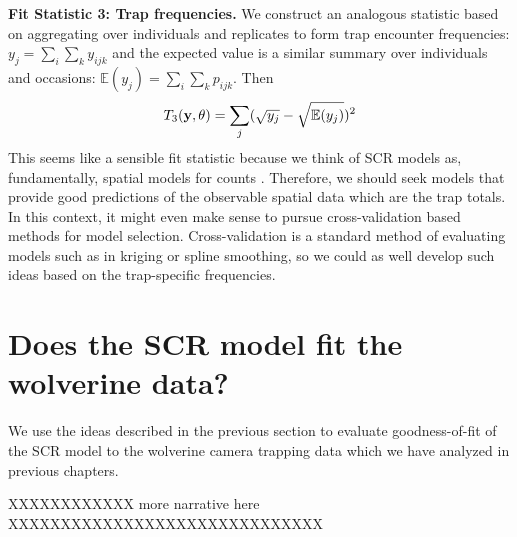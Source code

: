 {\bf Fit Statistic 3: Trap frequencies. } We construct an analogous
statistic based on aggregating over individuals and replicates to form
trap encounter frequencies: $y_{j} = \sum_{i} \sum_{k} y_{ijk}$
\citep{gopalaswamy_etal:2012ecol} and the expected value is a similar
summary over individuals and occasions: $\mathbb{E}(y_{j}) = \sum_{i}
\sum_{k} p_{ijk}$.  Then
\[
 T_{3}({\bf y}, \theta) = \sum_{j} (\sqrt{ y_{j} } - \sqrt{ \mathbb{E}(y_{j}) })^2
\]
This seems like a sensible fit statistic because we think of SCR
models as, fundamentally, spatial models for counts
\citep{chandler_royle:2012}. Therefore, we should seek models that
provide good predictions of the observable spatial data which are the
trap totals.  In this context, it might even make sense to pursue
cross-validation based methods for model selection.  Cross-validation
is a standard method of evaluating models such as in kriging or spline
smoothing, so we could as well develop such ideas based on the
trap-specific frequencies.


\section{Does the SCR model fit the wolverine data?}


We use the ideas described in the previous section to
 evaluate goodness-of-fit of the SCR model
to the wolverine camera trapping data which we have analyzed
in previous chapters.


XXXXXXXXXXXX more narrative here XXXXXXXXXXXXXXXXXXXXXXXXXXXXXX


